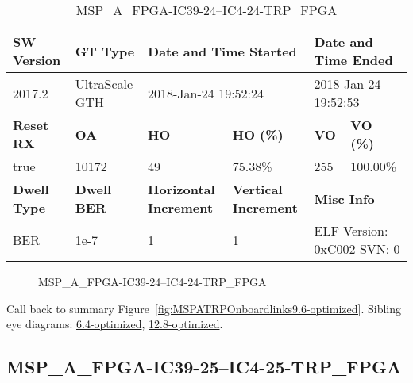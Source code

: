 \begin{table}[h]
\centering
\caption{MSP\_A\_FPGA-IC39-24--IC4-24-TRP\_FPGA}
\label{tab:MSPAFPGAIC3924IC424TRPFPGA9.6-optimized}
\begin{tabular}{@{}|l|l|l|l|l|l|@{}}
\toprule
\textbf{SW Version}                & \textbf{GT Type}   & \multicolumn{2}{l|}{\textbf{Date and Time Started}}            & \multicolumn{2}{l|}{\textbf{Date and Time Ended}}        \\ \midrule
2017.2                       & UltraScale GTH          & \multicolumn{2}{l|}{2018-Jan-24 19:52:24}                   & \multicolumn{2}{l|}{2018-Jan-24 19:52:53}               \\ \midrule
\textbf{Reset RX}                  & \textbf{OA} & \textbf{HO}   & \textbf{HO (\%)} & \textbf{VO} & \textbf{VO (\%)} \\ \midrule
true & 10172        & 49          & 75.38\%        & 255        & 100.00\%       \\ \midrule
\textbf{Dwell Type}                & \textbf{Dwell BER} & \textbf{Horizontal Increment} & \textbf{Vertical Increment}    & \multicolumn{2}{l|}{\textbf{Misc Info}}                  \\ \midrule
BER                            & 1e-7        & 1        & 1           & \multicolumn{2}{l|}{ELF Version: 0xC002 SVN: 0}                         \\ \bottomrule
\end{tabular}
\end{table}

\begin{figure}[h]
\caption{MSP\_A\_FPGA-IC39-24--IC4-24-TRP\_FPGA} \label{fig:MSPAFPGAIC3924IC424TRPFPGA9.6-optimized}
\end{figure}

Call back to summary Figure~\ref{fig:MSPATRPOnboardlinks9.6-optimized}.
Sibling eye diagrams: \hyperref[sec:MSPAFPGAIC3924IC424TRPFPGA6.4-optimized]{6.4-optimized}, \hyperref[sec:MSPAFPGAIC3924IC424TRPFPGA12.8-optimized]{12.8-optimized}.

\clearpage
\newpage


\subsection{MSP\_A\_FPGA-IC39-25--IC4-25-TRP\_FPGA}\label{sec:MSPAFPGAIC3925IC425TRPFPGA9.6-optimized}

